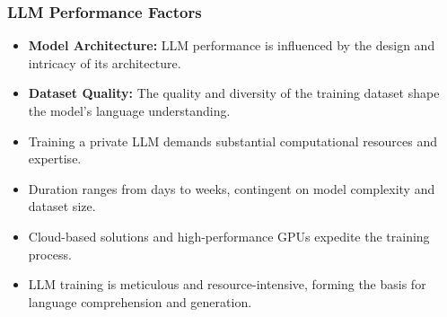 \begin{frame}[fragile]\frametitle{LLM Performance Factors}
  \begin{itemize}
    \item \textbf{Model Architecture:} LLM performance is influenced by the design and intricacy of its architecture.
    \item \textbf{Dataset Quality:} The quality and diversity of the training dataset shape the model's language understanding.
    \item Training a private LLM demands substantial computational resources and expertise.
    \item Duration ranges from days to weeks, contingent on model complexity and dataset size.
    \item Cloud-based solutions and high-performance GPUs expedite the training process.
    \item LLM training is meticulous and resource-intensive, forming the basis for language comprehension and generation.
  \end{itemize}
\end{frame}


